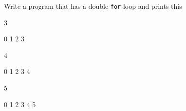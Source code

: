 Write a program that has a double \texttt{for}-loop and prints this

\begin{console}

3

  0 1 2 3

4

  0 1 2 3 4

5

  0 1 2 3 4 5

\end{console}

